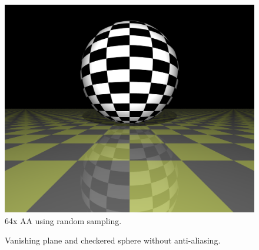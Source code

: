 \documentclass{article}
\begin{document}
\begin{figure}[H]
    \includegraphics[width=\textwidth]{./examples/AntiAliasingComparison/Scene_random64.png}
    \caption{64x AA using random sampling.}
\end{figure}

\pagebreak

\begin{figure}[H]
    \centering
    \caption{Vanishing plane and checkered sphere without anti-aliasing.}
\end{figure}
\end{document}
